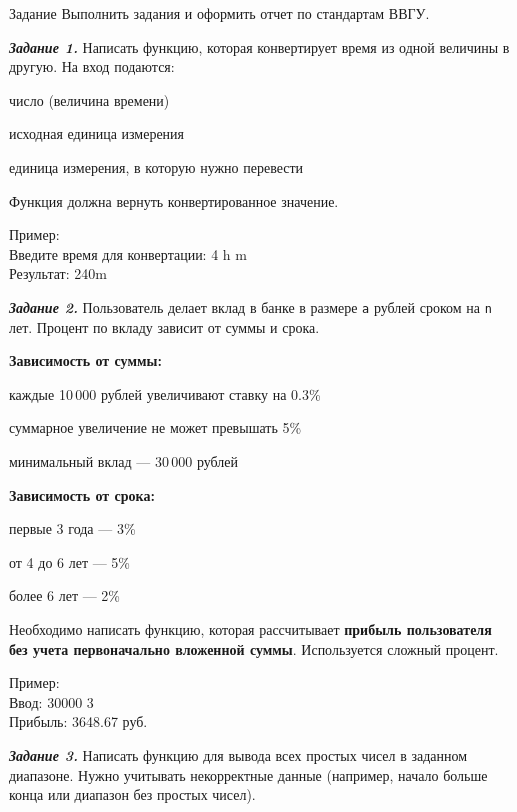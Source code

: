 \documentclass[]{vvsu}
\begin{document}
\begin{addition}{Задание}
  Выполнить задания и оформить отчет по стандартам ВВГУ.

 \textit{\textbf{Задание 1.}}  
  Написать функцию, которая конвертирует время из одной величины в другую.  
  На вход подаются:  
  \begin{vvsu_itemize}
    \item число (величина времени)
    \item исходная единица измерения
    \item единица измерения, в которую нужно перевести
  \end{vvsu_itemize}
  Функция должна вернуть конвертированное значение.

  Пример:\\
    Введите время для конвертации: 4 h m\\
    Результат: 240m

  \textit{\textbf{Задание 2.}}  
  Пользователь делает вклад в банке в размере \texttt{a} рублей сроком на \texttt{n} лет. Процент по вкладу зависит от суммы и срока.

  \textbf{Зависимость от суммы:}
  \begin{vvsu_itemize}
    \item каждые 10\,000 рублей увеличивают ставку на 0.3\%
    \item суммарное увеличение не может превышать 5\%
    \item минимальный вклад — 30\,000 рублей
  \end{vvsu_itemize}

  \textbf{Зависимость от срока:}
  \begin{vvsu_itemize}
    \item первые 3 года — 3\%
    \item от 4 до 6 лет — 5\%
    \item более 6 лет — 2\%
  \end{vvsu_itemize}

  Необходимо написать функцию, которая рассчитывает \textbf{прибыль пользователя без учета первоначально вложенной суммы}. Используется сложный процент.

  Пример:\\
    Ввод: 30000 3\\
    Прибыль: 3648.67 руб.

  \textit{\textbf{Задание 3.}}  
  Написать функцию для вывода всех простых чисел в заданном диапазоне. Нужно учитывать некорректные данные (например, начало больше конца или диапазон без простых чисел).


\end{addition}
\end{document}
